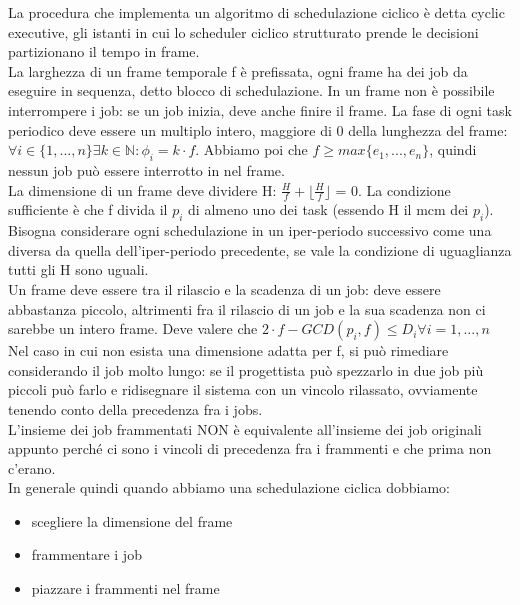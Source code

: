 \documentclass[12pt, oneside]{extbook}
\begin{document}
La procedura che implementa un algoritmo di schedulazione ciclico è detta cyclic executive, gli istanti in cui lo scheduler ciclico strutturato prende le decisioni partizionano il tempo in frame.\\ La larghezza di un frame temporale f è prefissata, ogni frame ha dei job da eseguire in sequenza, detto blocco di schedulazione. In un frame non è possibile interrompere i job: se un job inizia, deve anche finire il frame. La fase di ogni task periodico deve essere un multiplo intero, maggiore di 0 della lunghezza del frame: $\forall i \in \{1,...,n\} \exists k \in \mathbb{N}: \phi_i = k\cdot f$. Abbiamo poi che $f \geq max\{e_1,...,e_n\}$, quindi nessun job può essere interrotto in nel frame.\\ La dimensione di un frame deve dividere H: $\frac{H}{f} + \lfloor \frac{H}{f} \rfloor$ = 0. La condizione sufficiente è che f divida il $p_i$ di almeno uno dei task (essendo H il mcm dei $p_i$). Bisogna considerare ogni schedulazione in un iper-periodo successivo come una diversa da quella dell'iper-periodo precedente, se vale la condizione di uguaglianza tutti gli H sono uguali.\\ Un frame deve essere tra il rilascio e la scadenza di un job: deve essere abbastanza piccolo, altrimenti fra il rilascio di un job e la sua scadenza non ci sarebbe un intero frame. Deve valere che $2\cdot f - GCD(p_i, f) \leq D_i \forall i = 1,...,n$\\
Nel caso in cui non esista una dimensione adatta per f, si può rimediare considerando il job molto lungo: se il progettista può spezzarlo in due job più piccoli può farlo e ridisegnare il sistema con un vincolo rilassato, ovviamente tenendo conto della precedenza fra i jobs.\\
L'insieme dei job frammentati NON è equivalente all'insieme dei job originali appunto perché ci sono i vincoli di precedenza fra i frammenti e che prima non c'erano.\\
In generale quindi quando abbiamo una schedulazione ciclica dobbiamo:
\begin{itemize}
	\item scegliere la dimensione del frame
	\item frammentare i job
	\item piazzare i frammenti nel frame
\end{itemize}
\end{document}
